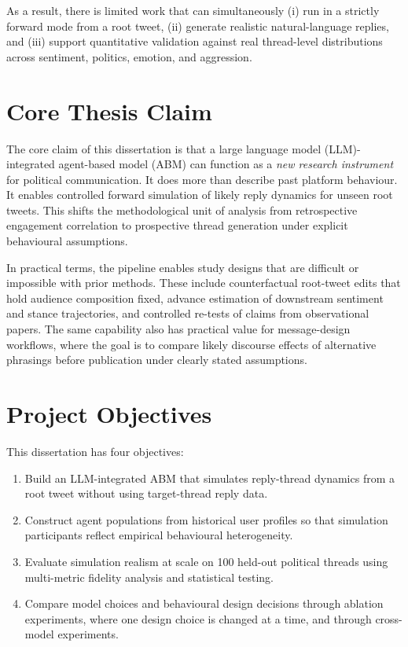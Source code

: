 \documentclass[logo,bsc,singlespacing,parskip,online]{infthesis}
\begin{document}
As a result, there is limited work that can simultaneously (i) run in a strictly forward mode from a root tweet, (ii) generate realistic natural-language replies, and (iii) support quantitative validation against real thread-level distributions across sentiment, politics, emotion, and aggression.

\section{Core Thesis Claim}
The core claim of this dissertation is that a large language model (LLM)-integrated agent-based model (ABM) can function as a \emph{new research instrument} for political communication. It does more than describe past platform behaviour. It enables controlled forward simulation of likely reply dynamics for unseen root tweets. This shifts the methodological unit of analysis from retrospective engagement correlation to prospective thread generation under explicit behavioural assumptions.

In practical terms, the pipeline enables study designs that are difficult or impossible with prior methods. These include counterfactual root-tweet edits that hold audience composition fixed, advance estimation of downstream sentiment and stance trajectories, and controlled re-tests of claims from observational papers. The same capability also has practical value for message-design workflows, where the goal is to compare likely discourse effects of alternative phrasings before publication under clearly stated assumptions.

\section{Project Objectives}
This dissertation has four objectives:
\begin{enumerate}
\item Build an LLM-integrated ABM that simulates reply-thread dynamics from a root tweet without using target-thread reply data.
\item Construct agent populations from historical user profiles so that simulation participants reflect empirical behavioural heterogeneity.
\item Evaluate simulation realism at scale on 100 held-out political threads using multi-metric fidelity analysis and statistical testing.
\item Compare model choices and behavioural design decisions through ablation experiments, where one design choice is changed at a time, and through cross-model experiments.
\end{enumerate}
\end{document}
